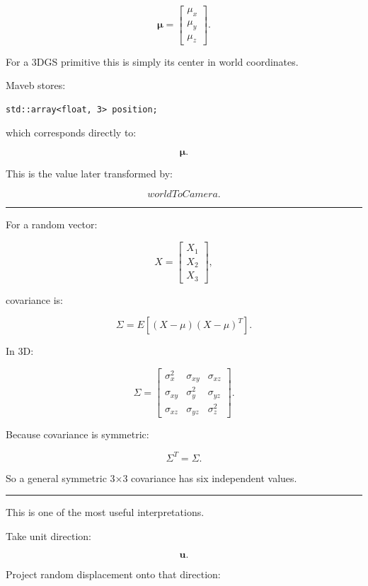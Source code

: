 \[
\boxed{
\boldsymbol\mu=
\begin{bmatrix}
\mu_x\\
\mu_y\\
\mu_z
\end{bmatrix}.
}
\]

For a 3DGS primitive this is simply its center in world coordinates.

Maveb stores:

\begin{verbatim}
std::array<float, 3> position;
\end{verbatim}

which corresponds directly to:

\[
\boldsymbol\mu.
\]

This is the value later transformed by:

\[
worldToCamera.
\]

\begin{center}\rule{0.5\linewidth}{0.5pt}\end{center}

For a random vector:

\[
X=
\begin{bmatrix}
X_1\\
X_2\\
X_3
\end{bmatrix},
\]

covariance is:

\[
\boxed{
\Sigma
=
E[
(X-\mu)
(X-\mu)^T
].
}
\]

In 3D:

\[
\Sigma=
\begin{bmatrix}
\sigma_x^2 & \sigma_{xy} & \sigma_{xz}\\
\sigma_{xy} & \sigma_y^2 & \sigma_{yz}\\
\sigma_{xz} & \sigma_{yz} & \sigma_z^2
\end{bmatrix}.
\]

Because covariance is symmetric:

\[
\Sigma^T=\Sigma.
\]

So a general symmetric 3×3 covariance has six independent values.

\begin{center}\rule{0.5\linewidth}{0.5pt}\end{center}

This is one of the most useful interpretations.

Take unit direction:

\[
\mathbf u.
\]

Project random displacement onto that direction:

